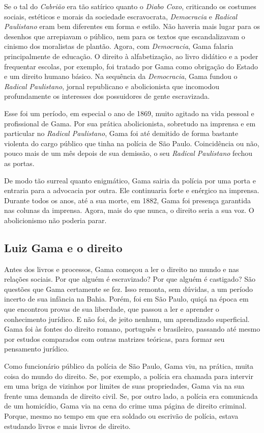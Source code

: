 Se o tal do \emph{Cabrião} era tão satírico quanto o \emph{Diabo Coxo},
criticando os costumes sociais, estéticos e morais da sociedade
escravocrata, \emph{Democracia} e \emph{Radical Paulistano} eram bem
diferentes em forma e estilo. Não haveria mais lugar para os desenhos
que arrepiavam o público, nem para os textos que escandalizavam o
cinismo dos moralistas de plantão. Agora, com \emph{Democracia}, Gama
falaria principalmente de educação. O direito à alfabetização, ao livro
didático e a poder frequentar escolas, por exemplo, foi tratado por Gama
como obrigação do Estado e um direito humano básico. Na sequência da
\emph{Democracia}, Gama fundou o \emph{Radical Paulistano}, jornal
republicano e abolicionista que incomodou profundamente os interesses
dos possuidores de gente escravizada.

Esse foi um período, em especial o ano de 1869, muito agitado na vida
pessoal e profissional de Gama. Por sua prática abolicionista, sobretudo
na imprensa e em particular no \emph{Radical Paulistano}, Gama foi até
demitido de forma bastante violenta do cargo público que tinha na
polícia de São Paulo. Coincidência ou não, pouco mais de um mês depois
de sua demissão, o seu \emph{Radical Paulistano} fechou as portas.

De modo tão surreal quanto enigmático, Gama sairia da polícia por uma
porta e entraria para a advocacia por outra. Ele continuaria forte e
enérgico na imprensa. Durante todos os anos, até a sua morte, em 1882,
Gama foi presença garantida nas colunas da imprensa. Agora, mais do que
nunca, o direito seria a sua voz. O abolicionismo não poderia parar.

\subsection{Luiz Gama e o direito}

Antes dos livros e processos, Gama começou a ler o direito no mundo e
nas relações sociais. Por que alguém é escravizado? Por que alguém é
castigado? São questões que Gama certamente se fez. Isso remonta, sem
dúvidas, a um período incerto de sua infância na Bahia. Porém, foi em
São Paulo, quiçá na época em que encontrou provas de sua liberdade, que
passou a ler e aprender o conhecimento jurídico. E não foi, de jeito
nenhum, um aprendizado superficial. Gama foi às fontes do direito
romano, português e brasileiro, passando até mesmo por estudos
comparados com outras matrizes teóricas, para formar seu pensamento
jurídico.

Como funcionário público da polícia de São Paulo, Gama viu, na prática,
muita coisa do mundo do direito. Se, por exemplo, a polícia era chamada
para intervir em uma briga de vizinhos por limites de suas propriedades,
Gama via na sua frente uma demanda de direito civil. Se, por outro lado,
a polícia era comunicada de um homicídio, Gama via na cena do crime uma
página de direito criminal. Porque, mesmo no tempo em que era soldado ou
escrivão de polícia, estava estudando livros e mais livros de direito.


